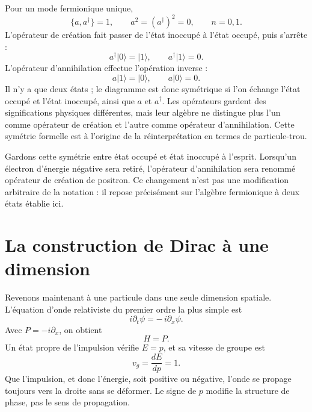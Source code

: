Pour un mode fermionique unique,
\begin{equation}
\{a,a^\dagger\}=1,
\qquad
a^2=(a^\dagger)^2=0,
\qquad
n=0,1.
\label{eq:l10-fermion-mode}
\end{equation}
L’opérateur de création fait passer de l’état inoccupé à l’état occupé, puis s’arrête :
\begin{equation}
a^\dagger\lvert0\rangle=\lvert1\rangle,
\qquad
a^\dagger\lvert1\rangle=0.
\end{equation}
L’opérateur d’annihilation effectue l’opération inverse :
\begin{equation}
a\lvert1\rangle=\lvert0\rangle,
\qquad
a\lvert0\rangle=0.
\end{equation}
Il n’y a que deux états ; le diagramme est donc symétrique si l’on échange l’état occupé et l’état inoccupé, ainsi que \(a\) et \(a^\dagger\). Les opérateurs gardent des significations physiques différentes, mais leur algèbre ne distingue plus l’un comme opérateur de création et l’autre comme opérateur d’annihilation. Cette symétrie formelle est à l’origine de la réinterprétation en termes de particule-trou.

\begin{classroomqa}
\end{classroomqa}

Gardons cette symétrie entre état occupé et état inoccupé à l’esprit. Lorsqu’un électron d’énergie négative sera retiré, l’opérateur d’annihilation sera renommé opérateur de création de positron. Ce changement n’est pas une modification arbitraire de la notation : il repose précisément sur l’algèbre fermionique à deux états établie ici.

\section{La construction de Dirac à une dimension}

Revenons maintenant à une particule dans une seule dimension spatiale. L’équation d’onde relativiste du premier ordre la plus simple est
\begin{equation}
i\partial_t\psi=-\,i\partial_x\psi.
\label{eq:l10-right-mover}
\end{equation}
Avec \(P=-i\partial_x\), on obtient
\begin{equation}
H=P.
\end{equation}
Un état propre de l’impulsion vérifie \(E=p\), et sa vitesse de groupe est
\begin{equation}
v_g=\frac{dE}{dp}=1.
\end{equation}
Que l’impulsion, et donc l’énergie, soit positive ou négative, l’onde se propage toujours vers la droite sans se déformer. Le signe de \(p\) modifie la structure de phase, pas le sens de propagation.

